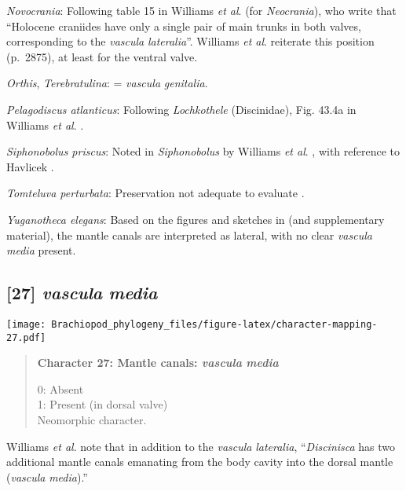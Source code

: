 \documentclass[openany]{book}
\theoremstyle{definition}
\theoremstyle{definition}
\theoremstyle{definition}
\theoremstyle{remark}
\begin{document}
\hypertarget{Novocrania-coding-26}{}
\emph{Novocrania}: Following table 15 in Williams \emph{et al}.
\citeyearpar{Williams2000LinguliformeaCraniiformea} (for
\emph{Neocrania}), who write that ``Holocene craniides have only a
single pair of main trunks in both valves, corresponding to the
\emph{vascula} \emph{lateralia}''. Williams \emph{et al}.
\citeyearpar{Williams2007Supplement} reiterate this position (p.~2875),
at least for the ventral valve.

\hypertarget{Orthis-coding-26}{}
\emph{Orthis}, \emph{Terebratulina}: = \emph{vascula} \emph{genitalia}.

\hypertarget{Pelagodiscus_atlanticus-coding-26}{}
\emph{Pelagodiscus atlanticus}: Following \emph{Lochkothele}
(Discinidae), Fig. 43.4a in Williams \emph{et al}.
\citeyearpar{Williams2000LinguliformeaCraniiformea}.

\hypertarget{Siphonobolus_priscus-coding-26}{}
\emph{Siphonobolus priscus}: Noted in \emph{Siphonobolus} by Williams
\emph{et al}. \citeyearpar{Williams2000LinguliformeaCraniiformea}, with
reference to Havlicek \citeyearpar{Havlicek1982LingulaceaPaterinacea}.

\hypertarget{Tomteluva_perturbata-coding-26}{}
\emph{Tomteluva perturbata}: Preservation not adequate to evaluate
\citep{Streng2016Anew}.

\hypertarget{Yuganotheca_elegans-coding-26}{}
\emph{Yuganotheca elegans}: Based on the figures and sketches in
\citet{Zhang2014Anearly} (and supplementary material), the mantle canals
are interpreted as lateral, with no clear \emph{vascula} \emph{media}
present.

\subsection*{\texorpdfstring{{[}27{]} \emph{vascula}
\emph{media}}{{[}27{]} vascula media}}\label{vascula-media}

\texttt{[image: Brachiopod\_phylogeny\_files/figure-latex/character-mapping-27.pdf]}

\begin{quote}
\textbf{Character 27: Mantle canals: \emph{vascula} \emph{media}}

0: Absent\\
1: Present (in dorsal valve)\\
Neomorphic character.
\end{quote}

Williams \emph{et al}. \citeyearpar{Williams1997Introduction} note that
in addition to the \emph{vascula} \emph{lateralia}, ``\emph{Discinisca}
has two additional mantle canals emanating from the body cavity into the
dorsal mantle (\emph{vascula} \emph{media}).''
\end{document}
